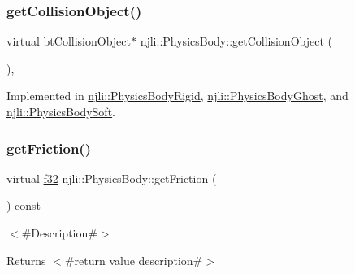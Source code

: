 \mbox{\label{classnjli_1_1_physics_body_ad3edabf71cfde91351bb428c9f06931e}} 
\subsubsection{\texorpdfstring{get\+Collision\+Object()}{getCollisionObject()}\hspace{0.1cm}{\footnotesize\ttfamily [2/2]}}
{\footnotesize\ttfamily virtual bt\+Collision\+Object$\ast$ njli\+::\+Physics\+Body\+::get\+Collision\+Object (\begin{DoxyParamCaption}{ }\end{DoxyParamCaption})\hspace{0.3cm}{\ttfamily [protected]}, {}}



Implemented in \mbox{\hyperlink{classnjli_1_1_physics_body_rigid_a47bfa192d6de09d5ce0486ed2cc09831}{njli\+::\+Physics\+Body\+Rigid}}, \mbox{\hyperlink{classnjli_1_1_physics_body_ghost_a6e5a9ffb4448b4a73bac8e3e44421698}{njli\+::\+Physics\+Body\+Ghost}}, and \mbox{\hyperlink{classnjli_1_1_physics_body_soft_a30c0af5e858983da4b549e883e6ca21a}{njli\+::\+Physics\+Body\+Soft}}.

\mbox{\label{classnjli_1_1_physics_body_a5140f2a2f0df419db4acfe85aa7ffc1c}} 
\subsubsection{\texorpdfstring{get\+Friction()}{getFriction()}}
{\footnotesize\ttfamily virtual \mbox{\hyperlink{_util_8h_a5f6906312a689f27d70e9d086649d3fd}{f32}} njli\+::\+Physics\+Body\+::get\+Friction (\begin{DoxyParamCaption}{ }\end{DoxyParamCaption}) const\hspace{0.3cm}{\ttfamily [virtual]}}

$<$\#\+Description\#$>$

\begin{DoxyReturn}{Returns}
$<$\#return value description\#$>$ 
\end{DoxyReturn}
\mbox{\label{classnjli_1_1_physics_body_a6f86b5736d90e252ec239357835377e9}} 
